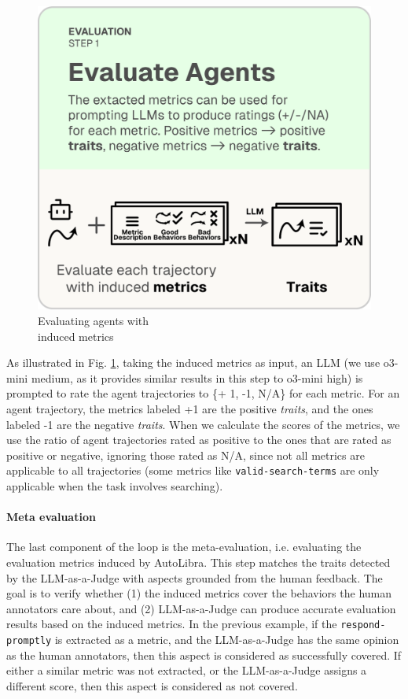 \begin{figure}
  \includegraphics[width=\linewidth]{figs/autolibra_step_3.pdf}
  \vspace{-10pt}
  \caption{Evaluating agents with \\ induced metrics}
  \label{fig:llm_as_a_judge}
\end{figure}
As illustrated in Fig. \ref{fig:llm_as_a_judge}, taking the induced metrics as input, an LLM (we use o3-mini medium,
as it provides similar results in this step to o3-mini high) is prompted to rate the agent trajectories to \{+ 1, -1, N/A\} for each metric. For an agent trajectory, the metrics labeled +1 are
the positive \emph{traits}, and the ones labeled -1 are the negative \emph{traits}. When we calculate the scores of
the metrics, we use the ratio of agent trajectories rated as positive
to the ones that are rated as positive or negative, ignoring those rated as N/A,
since not all metrics are applicable to all trajectories
(some metrics like \texttt{valid-search-terms} are only applicable when the task
involves searching). 


\paragraph{Meta evaluation}
The last component of the loop is the meta-evaluation, i.e. evaluating the evaluation metrics induced by AutoLibra.
This step matches the traits detected by the LLM-as-a-Judge with aspects
grounded from the human feedback. The goal is to verify whether (1) the induced metrics cover the behaviors the human annotators care about, and (2) LLM-as-a-Judge can produce
accurate evaluation results based on the induced metrics. In the previous example,
if the \texttt{respond-promptly} is extracted as a metric, and the LLM-as-a-Judge
has the same opinion as the human annotators, then this aspect is considered as successfully covered.
If either a similar metric was not extracted, or the LLM-as-a-Judge assigns a different score,
then this aspect is considered as not covered.

